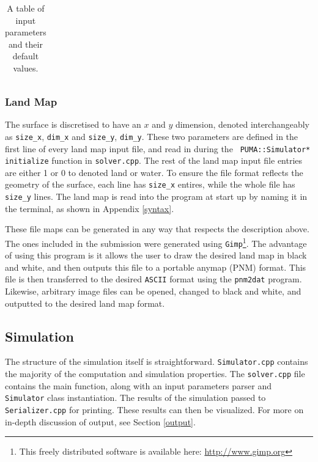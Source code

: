 \documentclass[a4paper,11pt]{article}
\begin{document}
{\begin{table}
\begin{tabular}{|l|l|l|l|}
\end{tabular}
\caption{A table of input parameters and their default values.}
\label{tb:parameters}
\end{table}


\subsubsection{Land Map}

The surface is discretised to have an $x$ and $y$ dimension, denoted interchangeably as \texttt{size\_x}, \texttt{dim\_x} and \texttt{size\_y}, \texttt{dim\_y}.  These two parameters are defined in the first line of every land map input file, and read in during the \texttt{ PUMA::Simulator* initialize} function in \texttt{solver.cpp}.  The rest of the land map input file entries are either 1 or 0 to denoted land or water.  To ensure the file format reflects the geometry of the surface, each line has \texttt{size\_x} entires, while the whole file has \texttt{size\_y} lines. The land map is read into the program at start up by naming it in the terminal, as shown in Appendix \ref{syntax}.

These file maps can be generated in any way that respects the description above.  The ones included in the submission were generated using \texttt{Gimp}\footnote{This freely distributed software is available here: \url{http://www.gimp.org}}.  The advantage of using this program is it allows the user to draw the desired land map in black and white, and then outputs this file to a portable anymap (PNM) format.  This file is then transferred to the desired \texttt{ASCII} format using the \texttt{pnm2dat} program.  Likewise, arbitrary image files can be opened, changed to black and white, and outputted to the desired land map format.

\subsection{Simulation}

The structure of the simulation itself is straightforward.  \texttt{Simulator.cpp} contains the majority of the computation and simulation properties.  The \texttt{solver.cpp} file contains the main function, along with an input parameters parser and \texttt{Simulator} class instantiation.  The results of the simulation passed to \texttt{Serializer.cpp} for printing.  These results can then be visualized.  For more on in-depth discussion of output, see Section \ref{output}.

}
\end{document}
